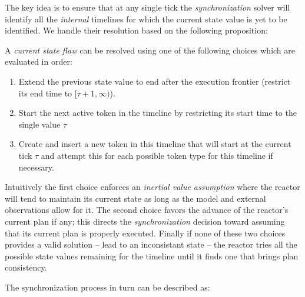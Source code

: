 The key idea is to ensure that at any single tick the {\em
  synchronization} solver will identify all the {\em internal}
timelines for which the current state value is yet to be
identified. We handle their resolution based on the following
proposition:

\begin{proposition}
  \label{prop:csf:resolve}
  A {\em current state flaw} can be resolved using one of the
  following choices which are evaluated in order:

  \begin{enumerate}

  \item Extend the previous state value to end after the execution
    frontier (\ie restrict its end time to $[\tau+1, \infty)$).

  \item Start the next active token in the timeline by restricting its
    start time to the single value $\tau$

  \item Create and insert a new token in this timeline that will start
    at the current tick $\tau$ and attempt this for each possible
    token type for this timeline if necessary.

\end{enumerate}
\end{proposition}

Intuitively the first choice enforces an \emph{inertial value
  assumption} where the reactor will tend to maintain its current
state as long as the model and external observations allow for it. The
second choice favors the advance of the reactor's current plan if any;
this directs the {\em synchronization} decision toward assuming that
its current plan is properly executed. Finally if none of these two
choices provides a valid solution -- \ie lead to an inconsistant state
-- the reactor tries all the possible state values remaining for the
timeline until it finds one that brings plan consistency.



The synchronization process in turn can be described as:

